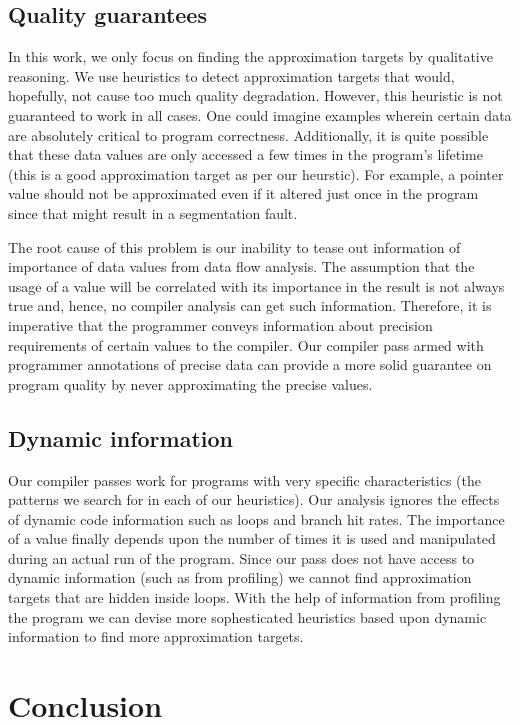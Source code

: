 \documentclass[12pt,conference]{IEEEtran}
\begin{document}
\subsection{Quality guarantees}

In this work, we only focus on finding the approximation targets by
qualitative reasoning. We use heuristics to detect approximation targets that 
would, hopefully, not cause too much quality degradation. However, this heuristic
is not guaranteed to work in all cases. One could imagine examples wherein certain
data are absolutely critical to program correctness. Additionally, it is quite possible
that these data values are only accessed a few times in the program's lifetime (this
is a good approximation target as per our heurstic). For example, a pointer value 
should not be approximated even if it altered just once in the program since that
might result in a segmentation fault. 

The root cause of this problem is our inability to tease out information of 
importance of data values from data flow analysis. The assumption that
the usage of a value will be correlated with its importance in the result
is not always true and, hence, no compiler analysis can get such information. 
Therefore, it is imperative that the programmer conveys information about 
precision requirements of certain values to the compiler\cite{approx}\cite{enerj}\cite{rely}.
Our compiler pass armed with programmer annotations of precise data can provide a 
more solid guarantee on program quality by never approximating the precise values.

\subsection{Dynamic information}

Our compiler passes work for programs with very specific characteristics (the patterns
we search for in each of our heuristics). Our analysis ignores the effects of 
dynamic code information such as loops and branch hit rates. The importance of 
a value finally depends upon the number of times it is used and manipulated 
during an actual run of the program. Since our pass does not have access to 
dynamic information (such as from profiling) we cannot find approximation targets that
are hidden inside loops. With the help of information from profiling the program 
we can devise more sophesticated heuristics based upon dynamic information to 
find more approximation targets.
 

\section{Conclusion}
\end{document}
